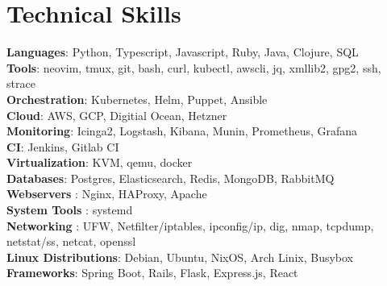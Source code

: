 \documentclass[letterpaper,11pt]{article}
\begin{document}
\section{Technical Skills}
 \begin{itemize}[leftmargin=0.15in, label={}]
    \small{\item{
     \textbf{Languages}{: Python, Typescript, Javascript, Ruby, Java, Clojure, SQL } \\
     \textbf{Tools}{: neovim, tmux, git, bash, curl, kubectl, awscli, jq, xmllib2, gpg2, ssh, strace } \\
     \textbf{Orchestration}{: Kubernetes, Helm, Puppet, Ansible } \\
     \textbf{Cloud}{: AWS, GCP, Digitial Ocean, Hetzner } \\
     \textbf{Monitoring}{: Icinga2, Logstash, Kibana, Munin, Prometheus, Grafana } \\
     \textbf{CI}{: Jenkins, Gitlab CI } \\
     \textbf{Virtualization}{: KVM, qemu, docker } \\
     \textbf{Databases}{: Postgres, Elasticsearch, Redis, MongoDB, RabbitMQ } \\
     \textbf{Webservers}{ : Nginx, HAProxy, Apache } \\
     \textbf{System Tools}{ : systemd } \\
     \textbf{Networking}{ : UFW, Netfilter/iptables, ipconfig/ip, dig, nmap, tcpdump, netstat/ss, netcat, openssl } \\
     \textbf{Linux Distributions}{: Debian, Ubuntu, NixOS, Arch Linix, Busybox } \\
     \textbf{Frameworks}{: Spring Boot, Rails, Flask, Express.js, React } \\

    }}
 \end{itemize}
\end{document}
